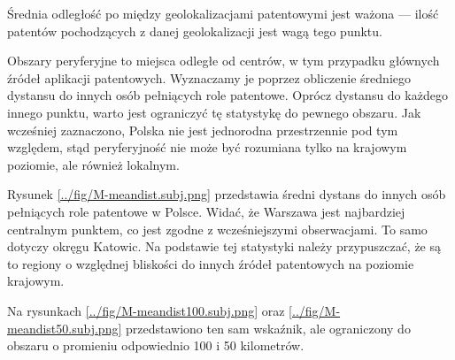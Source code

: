\begin{multicols}{2}


\begin{uwaga}
Średnia odległość po między geolokalizacjami patentowymi jest ważona ---
ilość patentów pochodzących z danej geolokalizacji jest wagą tego punktu.
\end{uwaga}

\end{multicols}

Obszary peryferyjne to miejsca odległe od centrów, w tym przypadku
głównych źródeł aplikacji patentowych. Wyznaczamy je poprzez obliczenie
średniego dystansu do innych osób pełniących role patentowe.
Oprócz dystansu do każdego innego punktu, warto jest ograniczyć
tę statystykę do pewnego obszaru. Jak wcześniej zaznaczono, Polska
nie jest jednorodna przestrzennie pod tym względem, stąd peryferyjność
nie może być rozumiana tylko na krajowym poziomie, ale również lokalnym.

Rysunek \ref{../fig/M-meandist.subj.png} przedstawia średni dystans
do innych osób pełniących role patentowe w Polsce. Widać, że Warszawa
jest najbardziej centralnym punktem, co jest zgodne z wcześniejszymi
obserwacjami. To samo dotyczy okręgu Katowic. Na podstawie tej statystyki 
należy przypuszczać, że są to regiony o względnej bliskości 
do innych źródeł patentowych na poziomie krajowym.

Na rysunkach \ref{../fig/M-meandist100.subj.png} oraz
\ref{../fig/M-meandist50.subj.png} przedstawiono ten sam
wskaźnik, ale ograniczony do obszaru o promieniu odpowiednio 100 i 50 kilometrów.
